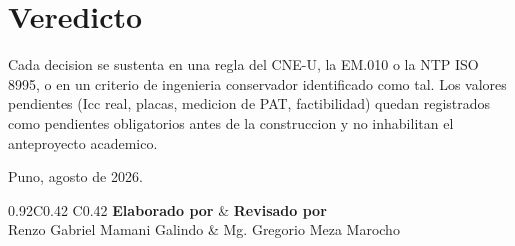 \documentclass[12pt,letterpaper]{report}
\begin{document}
\section*{Veredicto}
Cada decision se sustenta en una regla del CNE-U, la EM.010 o la NTP ISO 8995,
o en un criterio de ingenieria conservador identificado como tal. Los valores
pendientes (Icc real, placas, medicion de PAT, factibilidad) quedan registrados
como pendientes obligatorios antes de la construccion y no inhabilitan el
anteproyecto academico.

Puno, agosto de 2026.

\vspace{0.3in}
\begin{table}[H]
\centering
\renewcommand{\arraystretch}{1.3}
\begin{tabularx}{0.92\textwidth}{C{0.42\textwidth} C{0.42\textwidth}}
\toprule
\textbf{Elaborado por} & \textbf{Revisado por} \\
\midrule
\vspace{0.35in} Renzo Gabriel Mamani Galindo & \vspace{0.35in} Mg. Gregorio Meza Marocho \\
\bottomrule
\end{tabularx}
\end{table}
\end{document}
